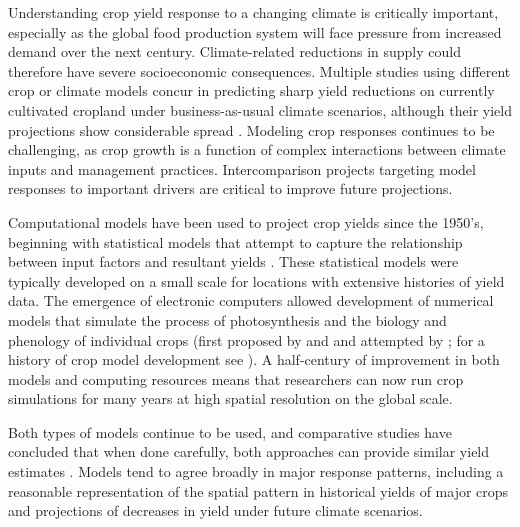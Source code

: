 \documentclass[esd, final]{copernicus} %
\begin{document}

\introduction
\label{S:1}
Understanding crop yield response to a changing climate is critically important, especially as the global food production system will face pressure from increased demand over the next century. Climate-related reductions in supply could therefore have severe socioeconomic consequences. Multiple studies using different crop or climate models concur in predicting sharp yield reductions on currently cultivated cropland under {business-as-usual} climate scenarios, although their yield projections show considerable spread \citep[e.g.][and references therein]{Rosenzweig2014, Schauberger2017, porter2014}. Modeling crop responses continues to be challenging, as crop growth is a function of complex interactions between climate inputs and management practices. Intercomparison projects targeting model responses to important drivers are critical to improve future projections.

Computational models have been used to project crop yields since the 1950's, beginning with statistical models  that attempt to capture the relationship between input factors and resultant yields \citep[e.g.][]{Heady57, Heady61}. These statistical models were typically developed on a small scale for locations with extensive histories of yield data. The emergence of electronic computers allowed development of numerical models that simulate the process of photosynthesis and the biology and phenology of individual crops (first proposed by \citet{wit58} and \citet{Duncan67} and attempted by \citet{Duncan72}; for a history of crop model development see \citet{Rosenzweig2014}). A half-century of improvement in both models and computing resources means that researchers can now run crop simulations for many years at high spatial resolution on the global scale. 

Both types of models continue to be used, and comparative studies have concluded that when done carefully, both approaches can provide similar yield estimates \citep[e.g.][]{Lobell2010, Moore2017, Roberts2017, zhao2017}. Models tend to agree broadly in major response patterns, including a reasonable representation of the spatial pattern in historical yields of major crops \citep[e.g.][]{Elliott2015, muller_global_2017} and projections of decreases in yield under future climate scenarios.
\end{document}
